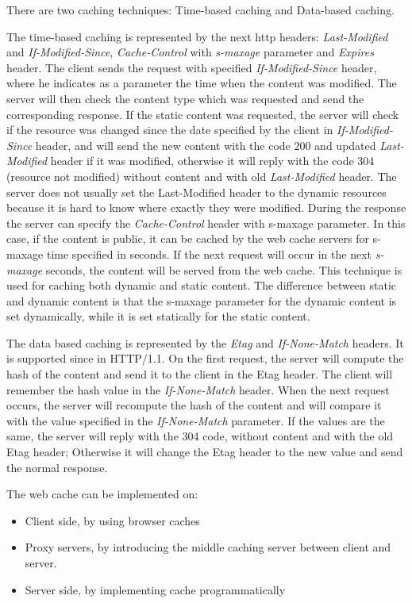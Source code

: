 There are two caching techniques: Time-based caching and Data-based caching.

The time-based caching is represented by the next http headers: \textit{Last-Modified} and \textit{If-Modified-Since}, \textit{Cache-Control} with \textit{s-maxage} parameter and \textit{Expires} header. The client sends the request with specified \textit{If-Modified-Since} header, where he indicates as a parameter the time when the content was modified. The server will then check the content type which was requested and send the corresponding response. If the static content was requested, the server will check if the resource was changed since the date specified by the client in \textit{If-Modified-Since} header, and will send the new content with the code 200 and updated \textit{Last-Modified} header if it was modified, otherwise it will reply with the code 304 (resource not modified) without content and with old \textit{Last-Modified} header. The server does not usually set the Last-Modified header to the dynamic resources because it is hard to know where exactly they were modified. 
During the response the server can specify the \textit{Cache-Control} header with s-maxage parameter. In this case, if the content is public, it can be cached by the web cache servers for s-maxage time specified in seconds. If the next request will occur in the next \textit{s-maxage} seconds, the content will be served from the web cache. This technique is used for caching both dynamic and static content. The difference between static and dynamic content is that the s-maxage parameter for the dynamic content is set dynamically, while it is set statically for the static content.

The data based caching is represented by the \textit{Etag} and \textit{If-None-Match} headers. It is supported since in HTTP/1.1. On the first request, the server will compute the hash of the content and send it to the client in the Etag header. The client will remember the hash value in the \textit{If-None-Match} header. When the next request occurs, the server will recompute the hash of the content and will compare it with the value specified in the \textit{If-None-Match} parameter. If the values are the same, the server will reply with the 304 code, without content and with the old Etag header; Otherwise it will change the Etag header to the new value and send the normal response. 


The web cache can be implemented on: 

\begin{itemize}
    \item Client side, by using browser caches
    \item Proxy servers, by introducing the middle caching server between client and server.
    \item Server side, by implementing cache programmatically
\end{itemize}

